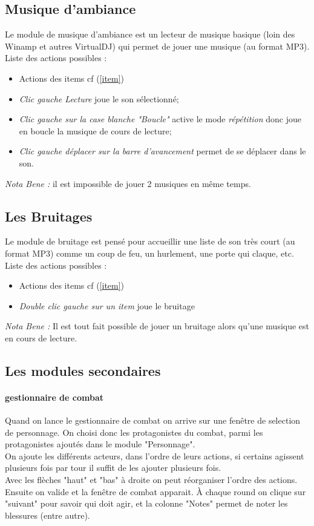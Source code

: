 \documentclass[a4paper,12pt]{article}
\begin{document}
\subsection{Musique d'ambiance}\label{musique}
Le module de musique d'ambiance est un lecteur de musique basique (loin des Winamp et autres VirtualDJ) qui permet de jouer une musique (au format MP3).
\\
Liste des actions possibles :
\begin{itemize}
    \item Actions des items cf (\ref{item})
    \item \emph{Clic gauche Lecture} joue le son sélectionné;
    \item \emph{Clic gauche sur la case blanche "Boucle"} active le mode \emph{répétition} donc joue en boucle la musique de cours de lecture;
    \item \emph{Clic gauche déplacer sur la barre d'avancement} permet de se déplacer dans le son.
\end{itemize}
\emph{Nota Bene :} il est impossible de jouer 2 musiques en même temps.

\subsection{Les Bruitages}\label{bruitage}
Le module de bruitage est pensé pour accueillir une liste de son très court (au format MP3) comme un coup de feu, un hurlement, une porte qui claque, etc.
\\
Liste des actions possibles :
\begin{itemize}
    \item Actions des items cf (\ref{item})
    \item \emph{Double clic gauche sur un item} joue le bruitage
\end{itemize}

\emph{Nota Bene :} Il est tout fait possible de jouer un bruitage alors qu'une musique est en cours de lecture.

\subsection{Les modules secondaires}
\paragraph{gestionnaire de combat}
Quand on lance le gestionnaire de combat on arrive sur une fenêtre de selection de personnage. On choisi donc les protagonistes du combat, parmi les protagonistes ajoutés dans le module "Personnage".
\\
On ajoute les différents acteurs, dans l'ordre de leurs actions, si certains agissent plusieurs fois par tour il suffit de les ajouter plusieurs fois.
\\
Avec les flèches "haut" et "bas" à droite on peut réorganiser l'ordre des actions.
\\
Ensuite on valide et la fenêtre de combat apparait. À chaque round on clique sur "suivant" pour savoir qui doit agir, et la colonne "Notes" permet de noter les blessures (entre autre).
\end{document}

